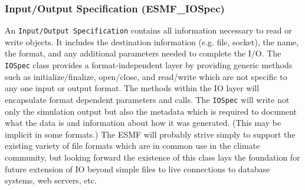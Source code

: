 \subsubsection{Input/Output Specification (ESMF\_IOSpec)}
\label{sec:iospec} 
An {\tt Input/Output Specification} contains all 
information necessary to read or write objects.  It includes the 
destination information (e.g. file, socket), the name,
the format, and any additional parameters needed to complete the I/O.
The {\tt IOSpec} class provides a format-independent layer by
providing generic methods such as initialize/finalize, open/close, 
and read/write which are not specific to any one input or output format.
The methods
within the IO layer will encapsulate format dependent parameters and calls.
The {\tt IOSpec} will write not only the simulation output 
but also the metadata which is required to document what the data is
and information about how it was generated.  (This may be implicit in
some formats.)
The ESMF will probably strive simply to
support the existing variety of file formats which are in common use in
the climate community, but looking forward
the existence of this class lays the foundation for future extension 
of IO beyond simple files to live connections to database systems, 
web servers, etc.






